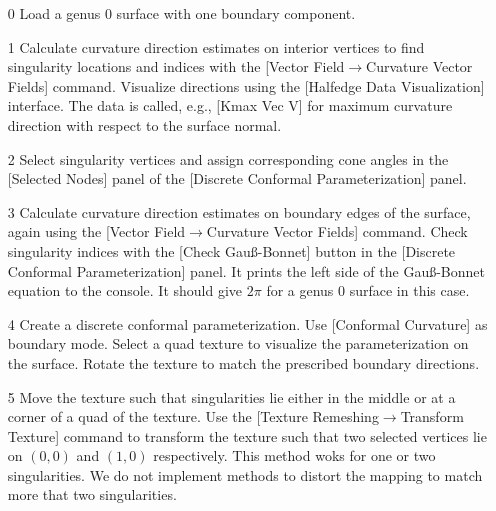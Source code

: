 \documentclass[Thesis.tex]{subfiles}
\begin{document}
\begin{itemize}
\item[0] Load a genus $0$ surface with one boundary component.
\item[1] Calculate curvature direction estimates on interior vertices to find singularity locations and indices with the [Vector Field$\to$Curvature Vector Fields] command. Visualize directions using the [Halfedge Data Visualization] interface. The data is called, e.g., [Kmax Vec V] for maximum curvature direction with respect to the surface normal.
\item[2] Select singularity vertices and assign corresponding cone angles in the [Selected Nodes] panel of the [Discrete Conformal Parameterization] panel.
\item[3] Calculate curvature direction estimates on boundary edges of the surface, again using the [Vector Field$\to$Curvature Vector Fields] command. Check singularity indices with the [Check Gau{\ss}-Bonnet] button in the [Discrete Conformal Parameterization] panel. It prints the left side of the Gau{\ss}-Bonnet equation to the console. It should give $2\pi$ for a genus $0$ surface in this case.

\begin{center}
\begin{minipage}{0.9\linewidth}
            \centering
\end{minipage}
\end{center}     
            
\item[4] Create a discrete conformal parameterization. Use [Conformal Curvature] as boundary mode. Select a quad texture to visualize the parameterization on the surface. Rotate the texture to match the prescribed boundary directions.
\item[5] Move the texture such that singularities lie either in the middle or at a corner of a quad of the texture. Use the [Texture Remeshing$\to$Transform Texture] command to transform the texture such that two selected vertices lie on $(0,0)$ and $(1,0)$ respectively. This method woks for one or two singularities. We do not implement methods to distort the mapping to match more that two singularities.


\end{itemize}
\end{document}
